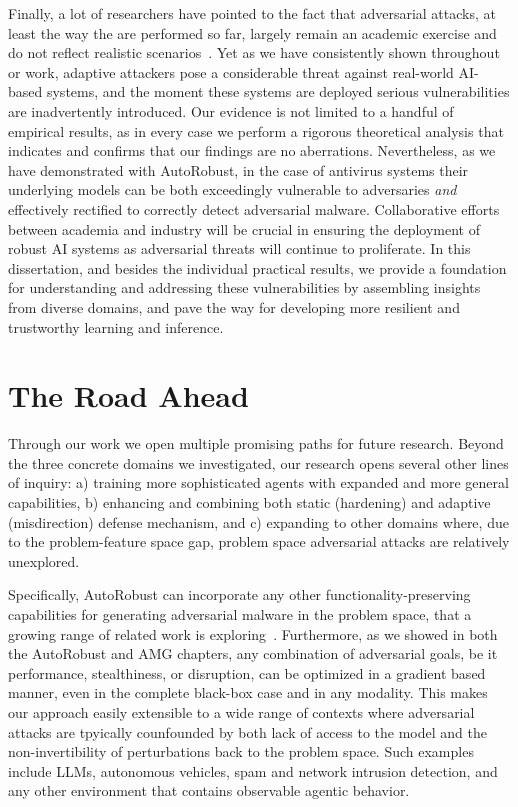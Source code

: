 Finally, a lot of researchers have pointed to the fact that adversarial attacks, at least the way the are performed so far, largely remain an academic exercise and do not reflect realistic scenarios~\cite{apruzzese2023real}.
Yet as we have consistently shown throughout or work, adaptive attackers pose a considerable threat against real-world AI-based systems, and the moment these systems are deployed serious vulnerabilities are inadvertently introduced.
Our evidence is not limited to a handful of empirical results, as in every case we perform a rigorous theoretical analysis that indicates and confirms that our findings are no aberrations.
Nevertheless, as we have demonstrated with AutoRobust, in the case of antivirus systems their underlying models can be both exceedingly vulnerable to adversaries \textit{and} effectively rectified to correctly detect adversarial malware.
Collaborative efforts between academia and industry will be crucial in ensuring the deployment of robust \gls{AI} systems as adversarial threats will continue to proliferate.
In this dissertation, and besides the individual practical results, we provide a foundation for understanding and addressing these vulnerabilities by assembling insights from diverse domains, and pave the way for developing more resilient and trustworthy learning and inference.

\section{The Road Ahead}

Through our work we open multiple promising paths for future research.
Beyond the three concrete domains we investigated, our research opens several other lines of inquiry: a) training more sophisticated agents with expanded and more general capabilities, b) enhancing and combining both static (hardening) and adaptive (misdirection) defense mechanism, and c) expanding to other domains where, due to the problem-feature space gap, problem space adversarial attacks are relatively unexplored.

Specifically, AutoRobust can incorporate any other functionality-preserving capabilities for generating adversarial malware in the problem space, that a growing range of related work is exploring~\cite{demetrio2021functionality, demetrio2021adversarial, labaca2021realizable, labaca2021aimed}.
Furthermore, as we showed in both the AutoRobust and AMG chapters, any combination of adversarial goals, be it performance, stealthiness, or disruption, can be optimized in a gradient based manner, even in the complete black-box case and in any modality.
This makes our approach easily extensible to a wide range of contexts where adversarial attacks are tpyically counfounded by both lack of access to the model and the non-invertibility of perturbations back to the problem space.
Such examples include LLMs, autonomous vehicles, spam and network intrusion detection, and any other environment that contains observable agentic behavior.

